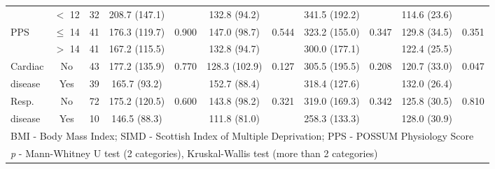\begin{sidewaystable}[p]
\begin{tabular}{|l c c | c c| c c | c c | c c|}
		                          & $<$ 12    & 32 & 208.7 (147.1) &                       & 132.8 (94.2)  &                   & 341.5 (192.2) &                & 114.6 (23.6) &  \\
		PPS                       & $\leq$ 14 & 41 & 176.3 (119.7) & 0.900                 & 147.0 (98.7)  & 0.544             & 323.2 (155.0) & 0.347          & 129.8 (34.5) & 0.351                 \\
		                          & $>$ 14    & 41 & 167.2 (115.5) &                       & 132.8 (94.7)  &                   & 300.0 (177.1) &                & 122.4 (25.5) &  \\
		Cardiac                   & No        & 43 & 177.2 (135.9) & 0.770                 & 128.3 (102.9) & 0.127             & 305.5 (195.5) & 0.208          & 120.7 (33.0) & 0.047                 \\
		disease                   & Yes       & 39 & 165.7 (93.2)  &                       & 152.7 (88.4)  &                   & 318.4 (127.6) &                & 132.0 (26.4) &  \\
		Resp.                     & No        & 72 & 175.2 (120.5) & 0.600                 & 143.8 (98.2)  & 0.321             & 319.0 (169.3) & 0.342          & 125.8 (30.5) & 0.810                 \\
		disease                   & Yes       & 10 & 146.5 (88.3)  &                       & 111.8 (81.0)  &                   & 258.3 (133.3) &                & 128.0 (30.9) &  \\ \hline
		\multicolumn{11}{l}{BMI - Body Mass Index; SIMD - Scottish Index of Multiple Deprivation; PPS - POSSUM Physiology Score}\\
				\multicolumn{11}{l}{\textit{p} - Mann-Whitney U test (2 categories), Kruskal-Wallis test (more than 2 categories)}
	\end{tabular}
\end{sidewaystable}
























